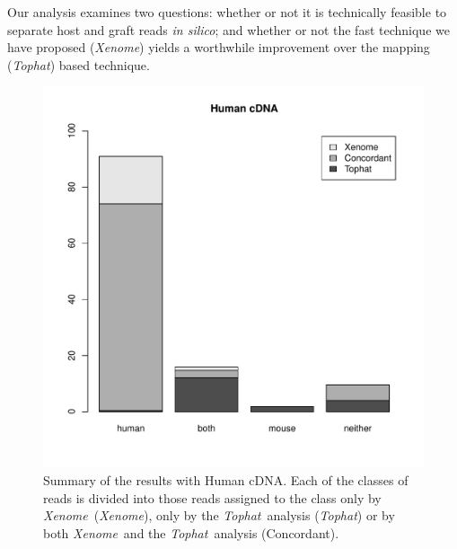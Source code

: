 \documentclass{bioinfo}
\newcommand{\Xenome}{\textit{Xenome}{}}
\newcommand{\Tophat}{\textit{Tophat}{}}
\begin{document}
Our analysis examines two questions: whether or not it is
technically feasible to separate host and graft reads \textit{in silico};
and whether or not the fast technique we have proposed (\Xenome)
yields a worthwhile improvement over the mapping (\Tophat) based
technique.

\begin{figure}
\includegraphics[scale=0.5]{human.pdf}
\caption{Summary of the results with Human cDNA. 
Each of the classes of reads is divided into those reads assigned to the class only by \Xenome\  (\Xenome), only by the \Tophat\ analysis (\Tophat) or by both \Xenome\ and the \Tophat\  analysis (Concordant).
}
\label{fig:human}
\end{figure}
\end{document}
